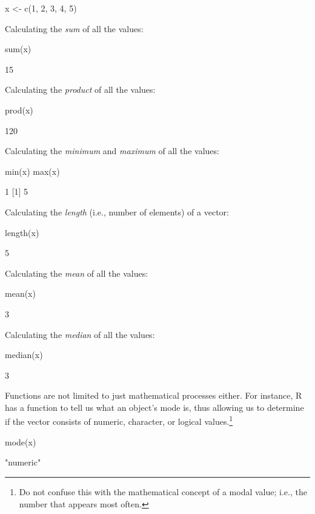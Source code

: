 \begin{inR}
x <- c(1, 2, 3, 4, 5)
\end{inR}
\medskip

\noindent
Calculating the \textit{sum} of all the values:
\begin{inR}
sum(x)
\end{inR}
\begin{outR}
[1] 15
\end{outR}

\noindent
Calculating the \textit{product} of all the values:
\begin{inR}
prod(x)
\end{inR}
\begin{outR}
[1] 120
\end{outR}

\noindent
Calculating the \textit{minimum} and \textit{maximum} of all the values:
\begin{inR}
min(x)
max(x)
\end{inR}
\begin{outR}
[1]  1
[1]  5
\end{outR}

\noindent
Calculating the \textit{length} (i.e., number of elements) of a vector:
\begin{inR}
length(x)
\end{inR}
\begin{outR}
[1] 5
\end{outR}

\noindent
Calculating the \textit{mean} of all the values:
\begin{inR}
mean(x)
\end{inR}
\begin{outR}
[1] 3
\end{outR}

\noindent
Calculating the \textit{median} of all the values:
\begin{inR}
median(x)
\end{inR}
\begin{outR}
[1] 3
\end{outR}

Functions are not limited to just mathematical processes either.  For instance, R has a function to tell us what an object's mode is, thus allowing us to determine if the vector consists of numeric, character, or logical values.\footnote{Do not confuse this with the mathematical concept of a modal value; i.e., the number that appears most often.}

\begin{inR}
mode(x)
\end{inR}
\begin{outR}
[1] "numeric"
\end{outR}

